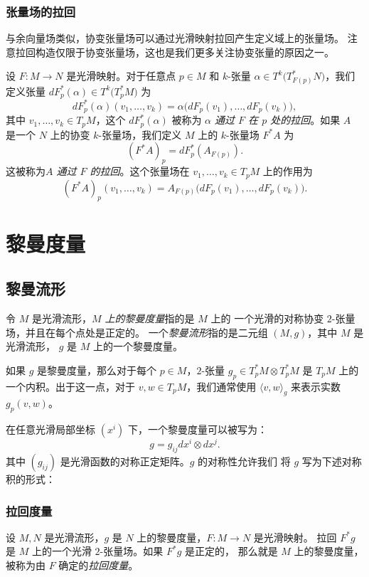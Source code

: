 \documentclass[fontset=none]{Notes}
\begin{document}
\subsection{张量场的拉回}

与余向量场类似，协变张量场可以通过光滑映射拉回产生定义域上的张量场。
注意拉回构造仅限于协变张量场，这也是我们更多关注协变张量的原因之一。

设 $F:M\to N$ 是光滑映射。对于任意点 $p\in M$ 和 $k$-张量
$\alpha\in T^k\bigl(T_{F(p)}^*N\bigr)$，我们定义张量
$dF_p^*(\alpha)\in T^k\bigl(T_p^*M\bigr)$ 为
\[
  dF_p^*(\alpha)(v_1,\dots,v_k)=\alpha\bigl(dF_p(v_1),\dots,dF_p(v_k)\bigr)  ,
\]
其中 $v_1,\dots,v_k\in T_pM$，这个 $dF_p^*(\alpha)$ 被称为
\emph{$\alpha$ 通过 $F$ 在 $p$ 处的拉回}。如果 $A$ 是一个
$N$ 上的协变 $k$-张量场，我们定义 $M$ 上的 $k$-张量场
$F^*A$ 为
\[
  (F^*A)  _p=dF_p^*(A_{F(p)}).
\]
这被称为\emph{$A$ 通过 $F$ 的拉回}。这个张量场在
$v_1,\dots,v_k\in T_pM$ 上的作用为
\[
  (F^*A)  _p(v_1,\dots,v_k)=A_{F(p)}\bigl(dF_p(v_1),\dots,dF_p(v_k)\bigr).
\]


 


\chapter{黎曼度量}

\section{黎曼流形}

令 $M$ 是光滑流形，\emph{$M$ 上的黎曼度量}指的是 $M$ 上的
一个光滑的对称协变 $2$-张量场，并且在每个点处是正定的。
一个\emph{黎曼流形}指的是二元组 $(M,g)$，其中 $M$ 是光滑流形，
$g$ 是 $M$ 上的一个黎曼度量。

如果 $g$ 是黎曼度量，那么对于每个 $p\in M$，$2$-张量 $g_p\in T_p^*M\otimes T_p^*M$
是 $T_pM$ 上的一个内积。出于这一点，对于 $v,w\in T_pM$，我们通常使用 $\langle v,w\rangle_g$
来表示实数 $g_p(v,w)$。

在任意光滑局部坐标 $\left(x^i\right)$ 下，一个黎曼度量可以被写为：
\[
  g=g_{ij}dx^i\otimes dx^j.  
\]
其中 $(g_{ij})$ 是光滑函数的对称正定矩阵。$g$ 的对称性允许我们
将 $g$ 写为下述对称积的形式：


\subsection{拉回度量}

设 $M,N$ 是光滑流形，$g$ 是 $N$ 上的黎曼度量，$F:M\to N$ 是光滑映射。
拉回 $F^*g$ 是 $M$ 上的一个光滑 $2$-张量场。如果 $F^*g$ 是正定的，
那么就是 $M$ 上的黎曼度量，被称为由 $F$ 确定的\emph{拉回度量}。
\end{document}
